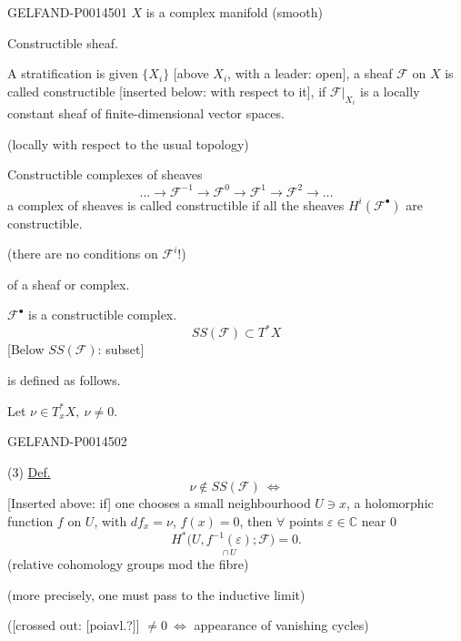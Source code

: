 \begin{GelfandAdjacentEvidence}{GELFAND-P001450}{1}
\(X\) is a complex manifold (smooth)

Constructible sheaf.

A stratification is given \(\{X_i\}\) [above \(X_i\), with a leader: open],
a sheaf \(\mathcal F\) on \(X\) is called constructible
[inserted below: with respect to it],
if \(\mathcal{F}|_{X_i}\) is a locally constant sheaf of finite-dimensional vector spaces.

(locally with respect to the usual topology)

Constructible complexes of sheaves
\begin{equation*}
\ldots\longrightarrow\mathcal{F}^{-1}
\longrightarrow\mathcal{F}^{0}
\longrightarrow\mathcal{F}^{1}
\longrightarrow\mathcal{F}^{2}\longrightarrow\ldots \tag{1}
\end{equation*}
a complex of sheaves is called constructible if all the sheaves \(H^{i}(\mathcal{F}^{\bullet})\) are constructible.

(there are no conditions on \(\mathcal{F}^{i}\)!)

 of a sheaf or complex.

\(\mathcal{F}^{\bullet}\) is a constructible complex.
\begin{equation*}
SS(\mathcal F)\subset T^*X \tag{2}
\end{equation*}
[Below \(SS(\mathcal F)\): subset]

is defined as follows.

Let \(\nu\in T_x^{*}X,\ \nu\ne0\).
\end{GelfandAdjacentEvidence}
\begin{GelfandAdjacentEvidence}{GELFAND-P001450}{2}


(3) \uline{Def.}
\[
\nu\notin SS(\mathcal{F})\ \Longleftrightarrow
\]
[Inserted above: if] one chooses a small neighbourhood \(U\ni x\), a holomorphic function \(f\) on \(U\),
with \(df_x=\nu\), \(f(x)=0\), then \(\forall\) points \(\varepsilon\in\mathbb C\) near \(0\)
\begin{equation*}
H^{*}\bigl(U,\underset{\cap\,U}{f^{-1}(\varepsilon)};\mathcal{F}\bigr)=0. \tag{4}
\end{equation*}
(relative cohomology groups mod the fibre)

(more precisely, one must pass to the inductive limit)

([crossed out: [poiavl.?]] \(\ne0\ \Longleftrightarrow\) appearance of vanishing cycles)
\end{GelfandAdjacentEvidence}


